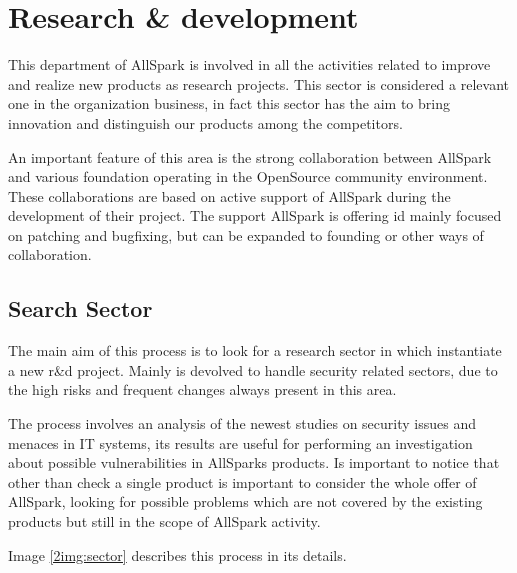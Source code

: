 \section{Research \& development}
This department of AllSpark is involved in all the activities related to
improve and realize new products as research projects. This sector is
considered a relevant one in the organization business, in fact this sector
has the aim to bring innovation and distinguish our products among the
competitors.

An important feature of this area is the strong collaboration between
AllSpark and various foundation operating in the OpenSource community
environment.
These collaborations are based on active support of AllSpark during the
development of their project. The support AllSpark is offering id mainly
focused on patching and bugfixing, but can be expanded to founding or other
ways of collaboration.

\subsection{Search Sector}
The main aim of this process is to look for a research sector in which
instantiate a new r\&d project. Mainly is devolved to handle security
related sectors, due to the high risks and frequent changes always present
in this area.

The process involves an analysis of the newest studies on security issues
and menaces in IT systems, its results are useful for performing an
investigation about possible vulnerabilities in AllSparks products. Is
important to notice that other than check a single product is important to
consider the whole offer of AllSpark, looking for possible problems which
are not covered by the existing products but still in the scope of AllSpark
activity.

Image \ref{2img:sector} describes this process in its details.

